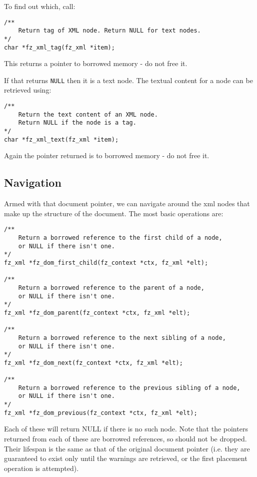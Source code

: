 \documentclass[oneside]{book}
\begin{document}
To find out which, call:

\begin{lstlisting}
/**
	Return tag of XML node. Return NULL for text nodes.
*/
char *fz_xml_tag(fz_xml *item);
\end{lstlisting}

This returns a pointer to borrowed memory - do not free it.

If that returns \texttt{NULL} then it is a text node. The textual content for a node can be retrieved using:

\begin{lstlisting}
/**
	Return the text content of an XML node.
	Return NULL if the node is a tag.
*/
char *fz_xml_text(fz_xml *item);
\end{lstlisting}

Again the pointer returned is to borrowed memory - do not free it.

\subsection{Navigation}

Armed with that document pointer, we can navigate around the xml nodes that make up the structure of the document. The most basic operations are:

\begin{lstlisting}
/**
	Return a borrowed reference to the first child of a node,
	or NULL if there isn't one.
*/
fz_xml *fz_dom_first_child(fz_context *ctx, fz_xml *elt);

/**
	Return a borrowed reference to the parent of a node,
	or NULL if there isn't one.
*/
fz_xml *fz_dom_parent(fz_context *ctx, fz_xml *elt);

/**
	Return a borrowed reference to the next sibling of a node,
	or NULL if there isn't one.
*/
fz_xml *fz_dom_next(fz_context *ctx, fz_xml *elt);

/**
	Return a borrowed reference to the previous sibling of a node,
	or NULL if there isn't one.
*/
fz_xml *fz_dom_previous(fz_context *ctx, fz_xml *elt);
\end{lstlisting}

Each of these will return NULL if there is no such node. Note that the pointers returned from each of these are borrowed references, so should not be dropped. Their lifespan is the same as that of the original document pointer (i.e. they are guaranteed to exist only until the warnings are retrieved, or the first placement operation is attempted).
\end{document}
